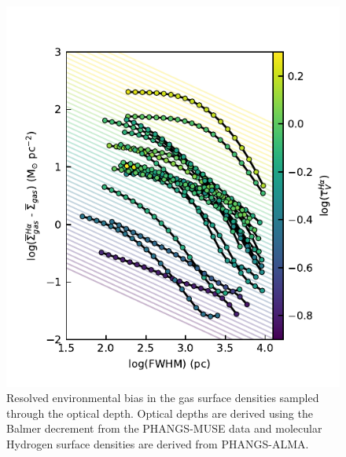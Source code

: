 \documentclass[fleqn,usenatbib]{mnras}
\begin{document}
\begin{figure}
    \centering
    \includegraphics[width=\columnwidth]{figures/fig7.pdf}
    \caption{Resolved environmental bias in the gas surface densities sampled through the optical depth. Optical depths are derived using the Balmer decrement from the PHANGS-MUSE data and molecular Hydrogen surface densities are derived from PHANGS-ALMA.}
    \label{fig:Excess_SD_dependence_resolution_tau}
\end{figure}
\end{document}
